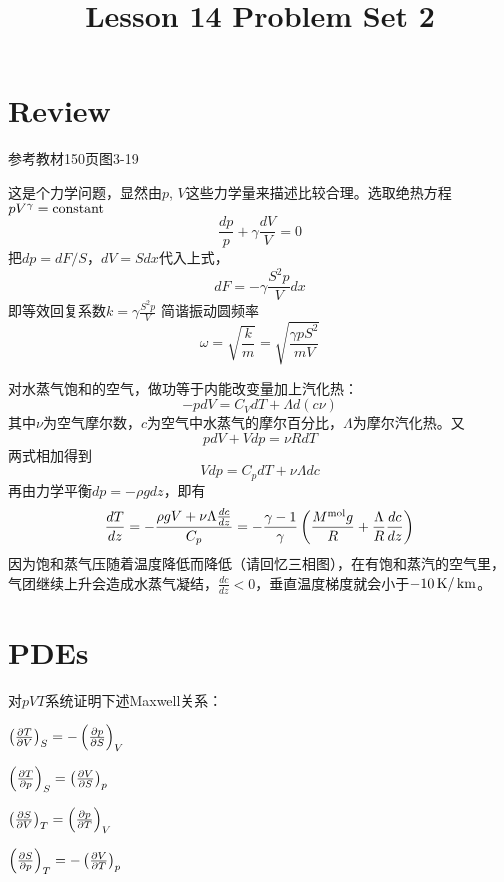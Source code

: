 \documentclass[CJK]{beamer}
\title{Lesson 14 Problem Set 2}
\author{}
\date{}
\begin{document}

\section{Review}


\begin{frame}
\bch
参考教材150页图3-19

这是个力学问题，显然由$p$, $V$这些力学量来描述比较合理。选取绝热方程$pV^\gamma = \mathrm{constant}$
$$ \frac{dp}{p} + \gamma \frac{dV}{V} = 0$$
把$dp = dF/S$，$dV = S dx$代入上式，
$$ dF = -\gamma \frac{S^2p}{V} dx $$
即等效回复系数$k =\gamma \frac{S^2p}{V} $ 简谐振动圆频率
$$\omega = \sqrt{\frac{k}{m}} = \sqrt{\frac{\gamma p S^2}{mV}}$$
\ech
\end{frame}

\begin{frame}
\bch
{\small
对水蒸气饱和的空气，做功等于内能改变量加上汽化热：
$$ -pdV = C_V dT + \Lambda d(c\nu) $$
其中$\nu$为空气摩尔数，$c$为空气中水蒸气的摩尔百分比，$\Lambda$为摩尔汽化热。又
$$pdV + Vdp = \nu R dT$$
两式相加得到
$$ Vdp = C_p  dT + \nu \Lambda dc $$
再由力学平衡$ dp = -\rho g dz$，即有
$$ \frac{dT}{dz} =-\frac{\rho g V + \nu\Lambda\frac{dc}{dz}}{C_p} = -\frac{\gamma-1}{\gamma}\left(\frac{M^{\rm mol}g}{R}+\frac{\Lambda}{R}\frac{dc}{dz}\right)$$
因为饱和蒸气压随着温度降低而降低（请回忆三相图），在有饱和蒸汽的空气里，气团继续上升会造成水蒸气凝结，$ \frac{dc}{dz} < 0 $，垂直温度梯度就会小于$-10\,\mathrm{K}/\,\mathrm{km}$。
}
\ech
\end{frame}

\section{PDEs}

\begin{frame}
  \bch



  \ech
\end{frame}


\begin{frame}
  \bch
  对$pVT$系统证明下述Maxwell关系：
\bitem
\item{$\left(\frac{\partial T}{\partial V}\right)_{S} = -\left(\frac{\partial p}{\partial S}\right)_{V}$}
\item{$\left(\frac{\partial T}{\partial p}\right)_{S} = \left(\frac{\partial V}{\partial S}\right)_{p}$}
\item{$\left(\frac{\partial S}{\partial V}\right)_{T} = \left(\frac{\partial p}{\partial T}\right)_{V}$}
\item{$\left(\frac{\partial S}{\partial p}\right)_{T} = -\left(\frac{\partial V}{\partial T}\right)_{p}$}
\eitem

\ech
\end{frame}
\end{document}
